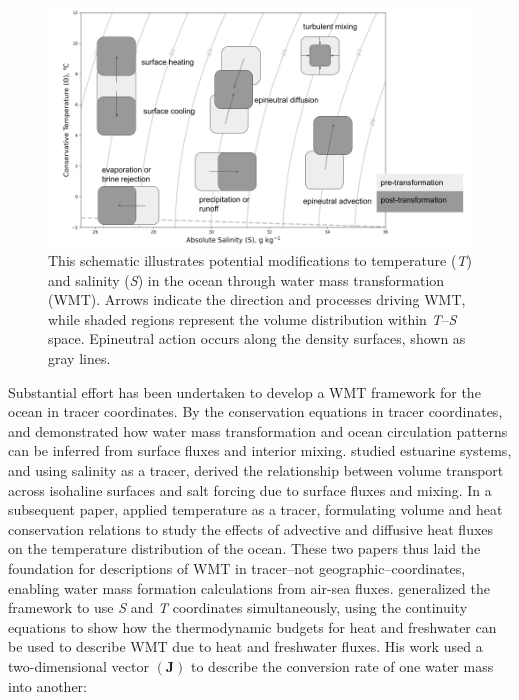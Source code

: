 \documentclass[draft]{agujournal2019}
\begin{document}
\begin{figure}
    \includegraphics[width=\linewidth]{figs/TS_example.png}
    \vspace{-5pt} %
    \caption{This schematic illustrates potential modifications to temperature (\emph{T}) and salinity (\emph{S}) in the ocean through water mass transformation (WMT). Arrows indicate the direction and processes driving WMT, while shaded regions represent the volume distribution within \emph{T}--\emph{S} space. Epineutral action occurs along the density surfaces, shown as gray lines.}
    \label{fig:TS_example}
\end{figure}

Substantial effort has been undertaken to develop a WMT framework for the ocean in tracer coordinates. By the conservation equations in tracer coordinates,  and  demonstrated how water mass transformation and ocean circulation patterns can be inferred from surface fluxes and interior mixing.  studied estuarine systems, and using salinity as a tracer, derived the relationship between volume transport across isohaline surfaces and salt forcing due to surface fluxes and mixing. In a subsequent paper,  applied temperature as a tracer, formulating volume and heat conservation relations to study the effects of advective and diffusive heat fluxes on the temperature distribution of the ocean. These two papers thus laid the foundation for descriptions of WMT in tracer--not geographic--coordinates, enabling water mass formation calculations from air-sea fluxes.  generalized the  framework to use \emph{S} and \emph{T} coordinates simultaneously, using the continuity equations to show how the thermodynamic budgets for heat and freshwater can be used to describe WMT due to heat and freshwater fluxes. His work used a two-dimensional vector $(\mathbf{J})$ to describe the conversion rate of one water mass into another:
\end{document}
